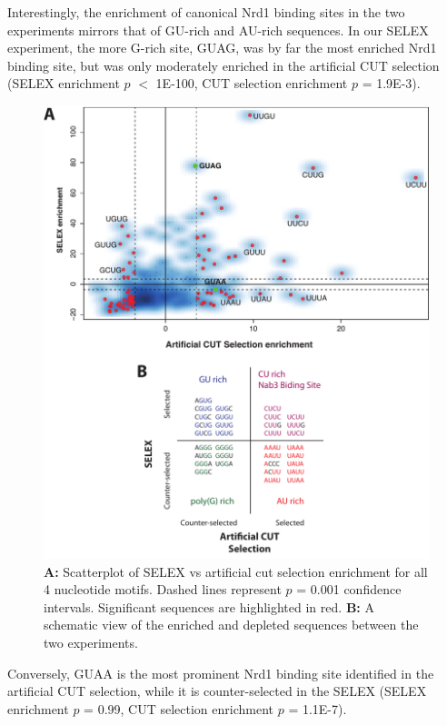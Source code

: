Interestingly, the enrichment of canonical Nrd1 binding sites in the two experiments mirrors that of GU-rich and AU-rich sequences. In our SELEX experiment, the more G-rich site, GUAG, was by far the most enriched Nrd1 binding site, but was only moderately enriched in the artificial CUT selection (SELEX enrichment $p$ $<$ 1E-100, CUT selection enrichment $p$ = 1.9E-3). 
\begin{figure}[h!]

\centering
\includegraphics[width=\textwidth]{figures/results/selexComparison}
\caption[Direct enrichment comparison between SELEX and artificial CUT selection for all 4 nucleotides motifs]{\textbf{A: }Scatterplot of SELEX vs artificial cut selection enrichment for all 4 nucleotide motifs. Dashed lines represent $p$ = 0.001 confidence intervals. Significant sequences are highlighted in red. \textbf{B: }A schematic view of the enriched and depleted sequences between the two experiments.}
\label{fig:selexComp}

\end{figure} 
Conversely, GUAA is the most prominent Nrd1 binding site identified in the artificial CUT selection, while it is counter-selected in the SELEX (SELEX enrichment $p$ = 0.99, CUT selection enrichment $p$ = 1.1E-7). 



